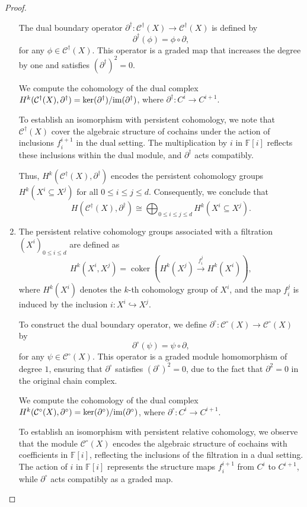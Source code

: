\begin{proof}
\begin{enumerate}
The dual boundary operator \( \partial^\dagger: \mathcal{C}^\dagger(X) \to \mathcal{C}^\dagger(X) \) is defined by
\[
\partial^\dagger(\phi) = \phi \circ \partial,
\]
for any \( \phi \in \mathcal{C}^\dagger(X) \). This operator is a graded map that increases the degree by one and satisfies $(\partial^\dagger)^2 = 0$.

We compute the cohomology of the dual complex $H^k(\mathcal{C}^\dagger(X), \partial^\dagger) = \ker(\partial^\dagger) / \mathrm{im}(\partial^\dagger)$, where \( \partial^\dagger: C^i \to C^{i+1} \).

To establish an isomorphism with persistent cohomology, we note that \( \mathcal{C}^\dagger(X) \) cover the algebraic structure of cochains under the action of inclusions \( f_{i}^{i+1} \) in the dual setting. The multiplication by \( i \) in \( \mathbb{F}[i] \) reflects these inclusions within the dual module, and \( \partial^\dagger \) acts compatibly.

Thus, \( H^k(\mathcal{C}^\dagger(X), \partial^\dagger) \) encodes the persistent cohomology groups \( H^k(X^i \subseteq X^j) \) for all \( 0 \leq i \leq j \leq d \). Consequently, we conclude that
\[
H(\mathcal{C}^\dagger(X), \partial^\dagger) \cong \bigoplus_{0 \leq i \leq j \leq d} H^k(X^i \subseteq X^j).
\]
\item The persistent relative cohomology groups associated with a filtration \( (X^i)_{0 \leq i \leq d} \) are defined as
\[
H^k(X^i, X^j) = \operatorname{coker} \left( H^k(X^j) \xrightarrow{f_{i}^{j}} H^k(X^i) \right),
\]
where \( H^k(X^i) \) denotes the \( k \)-th cohomology group of \( X^i \), and the map \( f_{i}^{j} \) is induced by the inclusion \( i: X^i \hookrightarrow X^j \).

To construct the dual boundary operator, we define \( \partial^\circ: \mathcal{C}^\circ(X) \to \mathcal{C}^\circ(X) \) by
\[
\partial^\circ(\psi) = \psi \circ \partial,
\]
for any \( \psi \in \mathcal{C}^\circ(X) \). This operator is a graded module homomorphism of degree \( 1 \), ensuring that \( \partial^\circ \) satisfies $(\partial^\circ)^2 = 0$, due to the fact that \( \partial^2 = 0 \) in the original chain complex.

We compute the cohomology of the dual complex $H^k(\mathcal{C}^\circ(X), \partial^\circ) = \ker(\partial^\circ) / \mathrm{im}(\partial^\circ)$, where \( \partial^\circ: C^i \to C^{i+1} \).

To establish an isomorphism with persistent relative cohomology, we observe that the module \( \mathcal{C}^\circ(X) \) encodes the algebraic structure of cochains with coefficients in \( \mathbb{F}[i] \), reflecting the inclusions of the filtration in a dual setting. The action of \( i \) in \( \mathbb{F}[i] \) represents the structure maps \( f_{i}^{i+1} \) from \( C^i \) to \( C^{i+1} \), while \( \partial^\circ \) acts compatibly as a graded map.


\end{enumerate}
\end{proof}
